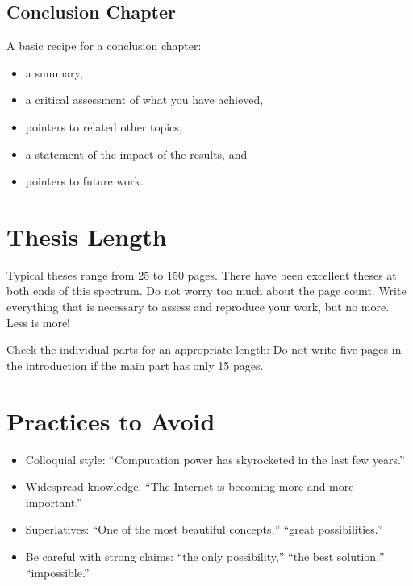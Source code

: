 \subsection{Conclusion Chapter}

A basic recipe for a conclusion chapter:
\begin{itemize}
\item a summary,
\item a critical assessment of what you have achieved,
\item pointers to related other topics,
\item a statement of the impact of the results, and
\item pointers to future work.
\end{itemize}

\section{Thesis Length}

Typical theses range from 25 to 150 pages. There have been excellent theses at both ends of this spectrum. Do not worry too much about the page count. Write everything that is necessary to assess and reproduce your work, but no more. Less is more!

Check the individual parts for an appropriate length: Do not write five pages in the introduction if the main part has only 15 pages.


\section{Practices to Avoid}

\begin{itemize}
\item Colloquial style: “Computation power has skyrocketed in the last few years.”
\item Widespread knowledge: “The Internet is becoming more and more important.”
\item Superlatives: “One of the most beautiful concepts,” “great possibilities.”
\item Be careful with strong claims: “the only possibility,” “the best solution,” “impossible.”
\end{itemize}